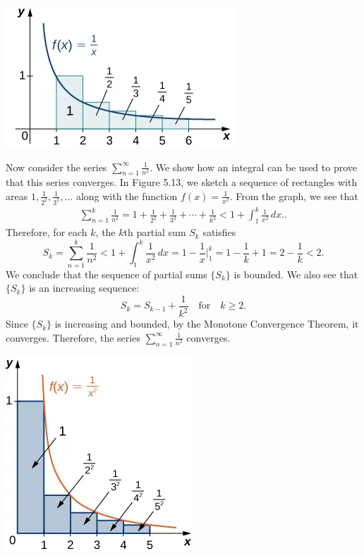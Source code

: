 \documentclass{report}
\begin{document}
    \bigbreak \noindent 
    \begin{center}
        \includegraphics[scale=0.5]{./figures/mane9.png}
    \end{center}
    \bigbreak \noindent 
    Now consider the series $\sum_{n=1}^{\infty} \frac{1}{n^2}$. We show how an integral can be used to prove that this series converges. In Figure 5.13, we sketch a sequence of rectangles with areas $1, \frac{1}{2^2}, \frac{1}{3^2}, \ldots$ along with the function $f(x) = \frac{1}{x^2}$. From the graph, we see that
    \bigbreak \noindent 
    \begin{align*}
        \sum_{n=1}^{k} \frac{1}{n^2} = 1 + \frac{1}{2^2} + \frac{1}{3^2} + \cdots + \frac{1}{k^2} < 1 + \int_{1}^{k} \frac{1}{x^2} \, dx.
    .\end{align*}
    Therefore, for each $k$, the $k$th partial sum $S_k$ satisfies
    \[ S_k = \sum_{n=1}^{k} \frac{1}{n^2} < 1 + \int_{1}^{k} \frac{1}{x^2} \, dx = 1 - \frac{1}{x} \Bigg|_{1}^{k} = 1 - \frac{1}{k} + 1 = 2 - \frac{1}{k} < 2. \]
    We conclude that the sequence of partial sums $\{S_k\}$ is bounded. We also see that $\{S_k\}$ is an increasing sequence:
    \[ S_k = S_{k-1} + \frac{1}{k^2} \quad \text{for} \quad k \geq 2. \]
    Since $\{S_k\}$ is increasing and bounded, by the Monotone Convergence Theorem, it converges. Therefore, the series $\sum_{n=1}^{\infty} \frac{1}{n^2}$ converges.
    \bigbreak \noindent 
    \begin{center}
        \includegraphics[scale=0.5]{./figures/mane10.png}
    \end{center}
\end{document}
